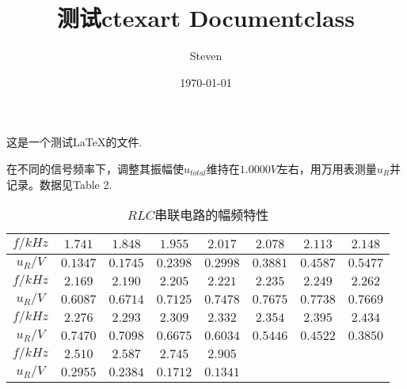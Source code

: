 \documentclass[a4paper, 12pt]{article}
\title{测试ctexart Documentclass}
\author{Steven}
\date{\today}
\begin{document}
\maketitle
这是一个测试\LaTeX 的文件.\par

在不同的信号频率下，调整其振幅使$u_{total}$维持在$1.0000V$左右，用万用表测量$u_R$并记录。数据见Table 2.
\begin{table}[H]
\centering
\begin{tabular}{|c|c|c|c|c|c|c|c|}
\hline
$f/kHz$ & $1.741$ & $1.848$ & $1.955$ & $2.017$ & $2.078$ & $2.113$ & $2.148$ \\
\hline
$u_R/V$ & $0.1347$ & $0.1745$ & $0.2398$ & $0.2998$ & $0.3881$ & $0.4587$ & $0.5477$\\
\hline
\hline
$f/kHz$ & $2.169$ & $2.190$ & $2.205$ & $2.221$ & $2.235$ & $2.249$ & $2.262$ \\
\hline
$u_R/V$ & $0.6087$ & $0.6714$ & $0.7125$ & $0.7478$ & $0.7675$ & $0.7738$ & $0.7669$\\
\hline
\hline
$f/kHz$ & $2.276$ & $2.293$ & $2.309$ & $2.332$ & $2.354$ & $2.395$ & $2.434$ \\
\hline
$u_R/V$ & $0.7470$ & $0.7098$ & $0.6675$ & $0.6034$ & $0.5446$ & $0.4522$ & $0.3850$\\
\hline
\hline
$f/kHz$ & $2.510$ & $2.587$ & $2.745$ & $2.905$ &  & &  \\
\hline
$u_R/V$ & $0.2955$ & $0.2384$ & $0.1712$ & $0.1341$ & & &\\
\hline
\end{tabular}
\caption{$RLC$串联电路的幅频特性}
\end{table}
\end{document}
